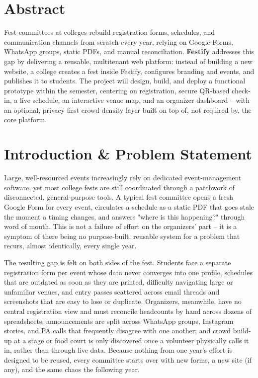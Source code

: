 \documentclass[11pt,a4paper]{article}
\begin{document}
\section*{Abstract}
Fest committees at colleges rebuild registration forms, schedules, and communication
channels from scratch every year, relying on Google Forms, WhatsApp groups, static PDFs,
and manual reconciliation. \textbf{Festify} addresses this gap by delivering a reusable,
multitenant web platform: instead of building a new website, a college creates a fest
inside Festify, configures branding and events, and publishes it to students. The
project will design, build, and deploy a functional prototype within the semester,
centering on registration, secure QR-based check-in, a live schedule, an interactive
venue map, and an organizer dashboard -- with an optional, privacy-first crowd-density
layer built on top of, not required by, the core platform.

\section{Introduction \& Problem Statement}

Large, well-resourced events increasingly rely on dedicated event-management software,
yet most college fests are still coordinated through a patchwork of disconnected,
general-purpose tools. A typical fest committee opens a fresh Google Form for every
event, circulates a schedule as a static PDF that goes stale the moment a timing
changes, and answers "where is this happening?" through word of mouth. This is not a
failure of effort on the organizers' part -- it is a symptom of there being no
purpose-built, reusable system for a problem that recurs, almost identically, every
single year.

The resulting gap is felt on both sides of the fest. Students face a separate
registration form per event whose data never converges into one profile, schedules that
are outdated as soon as they are printed, difficulty navigating large or unfamiliar
venues, and entry passes scattered across email threads and screenshots that are easy to
lose or duplicate. Organizers, meanwhile, have no central registration view and must
reconcile headcounts by hand across dozens of spreadsheets; announcements are split
across WhatsApp groups, Instagram stories, and PA calls that frequently disagree with
one another; and crowd build-up at a stage or food court is only discovered once a
volunteer physically calls it in, rather than through live data. Because nothing from
one year's effort is designed to be reused, every committee starts over with new forms,
a new site (if any), and the same chaos the following year.
\end{document}
